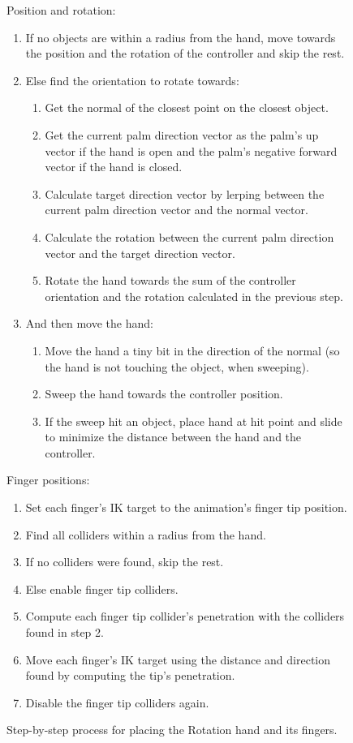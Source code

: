 \begin{figure}[H]
\small
Position and rotation:
\begin{enumerate}[noitemsep]
\item If no objects are within a radius from the hand, move towards the position and the rotation of the controller and skip the rest.
\item Else find the orientation to rotate towards:
\begin{enumerate}[noitemsep]
\item Get the normal of the closest point on the closest object.
\item Get the current palm direction vector as the palm's up vector if the hand is open and the palm's negative forward vector if the hand is closed.
\item Calculate target direction vector by lerping between the current palm direction vector and the normal vector.
\item Calculate the rotation between the current palm direction vector and the target direction vector.
\item Rotate the hand towards the sum of the controller orientation and the rotation calculated in the previous step.
\end{enumerate}
\item And then move the hand:
\begin{enumerate}[noitemsep]
\item Move the hand a tiny bit in the direction of the normal (so the hand is not touching the object, when sweeping).
\item Sweep the hand towards the controller position.
\item If the sweep hit an object, place hand at hit point and slide to minimize the distance between the hand and the controller.
\end{enumerate}
\end{enumerate}
Finger positions:
\begin{enumerate}[noitemsep]
\item Set each finger's IK target to the animation's finger tip position.
\item Find all colliders within a radius from the hand.
\item If no colliders were found, skip the rest.
\item Else enable finger tip colliders.
\item Compute each finger tip collider's penetration with the colliders found in step 2.
\item Move each finger's IK target using the distance and direction found by computing the tip's penetration.
\item Disable the finger tip colliders again.
\end{enumerate}
\caption{Step-by-step process for placing the Rotation hand and its fingers.}
\label{fig:stepByStepRotationHand}
\end{figure}

